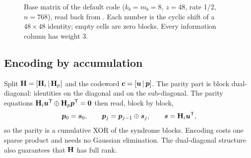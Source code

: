 \begin{figure}[htbp]
\centering
{}
\caption{Base matrix of the default code ($k_b=m_b=8$, $z=48$, rate 1/2, $n=768$), read back from
. Each number is the cyclic shift of a $48\times48$ identity; empty cells are
zero blocks. Every information column has weight 3.}
\label{fig:ldpc-base}
\end{figure}

\subsection{Encoding by accumulation}
Split $\mathbf{H}=[\mathbf{H}_i\,|\,\mathbf{H}_p]$ and the codeword $\bm{c}=[\bm{u}\,|\,\bm{p}]$. The
parity part is block dual-diagonal: identities on the diagonal and on the sub-diagonal. The
parity equations $\mathbf{H}_i\bm{u}^{\mathsf{T}}\oplus\mathbf{H}_p\bm{p}^{\mathsf{T}}=\bm{0}$ then read, block by block,
\begin{equation}
  \bm{p}_0=\bm{s}_0,\qquad \bm{p}_j=\bm{p}_{j-1}\oplus\bm{s}_j,\qquad \bm{s}=\mathbf{H}_i\bm{u}^{\mathsf{T}} ,
\end{equation}
so the parity is a cumulative XOR of the syndrome blocks. Encoding costs one sparse product and
needs no Gaussian elimination. The dual-diagonal structure also guarantees that $\mathbf{H}$ has
full rank.

